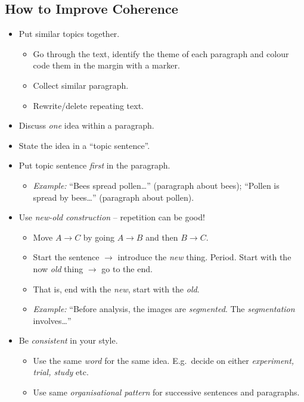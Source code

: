 \documentclass[10pt,a4paper,twocolumn]{scrartcl}
\newcommand{\ra}{\rightarrow}
\begin{document}
\subsection{How to Improve Coherence}
\begin{itemize}
    \item Put similar topics together.
        \begin{itemize}
            \item Go through the text, identify the theme of each paragraph and colour code them in the margin with a marker.
            \item Collect similar paragraph.
            \item Rewrite/delete repeating text.
        \end{itemize}
        
    \item Discuss \emph{one} idea within a paragraph.
    \item State the idea in a ``topic sentence''.
    \item Put topic sentence \emph{first} in the paragraph.
        \begin{itemize}
            \item \emph{Example:} ``Bees spread pollen\dots'' (paragraph about bees); ``Pollen is spread by bees\dots'' (paragraph about pollen).
        \end{itemize}
        
    \item Use \emph{new-old construction} -- repetition can be good!
        \begin{itemize}
            \item Move $A \ra C$ by going $A \ra B$ and then $B \ra C$.
            \item Start the sentence $\ra$ introduce the \emph{new} thing. Period. Start with the now \emph{old} thing $\ra$ go to the end.
            \item That is, end with the \emph{new}, start with the \emph{old}.
            \item \emph{Example:} ``Before analysis, the images are \emph{segmented}. The \emph{segmentation} involves\dots''
        \end{itemize}
        
    \item Be \emph{consistent} in your style.
        \begin{itemize}
            \item Use the same \emph{word} for the same idea. E.g.\ decide on either \emph{experiment, trial, study} etc.
            \item Use same \emph{organisational pattern} for successive sentences and paragraphs.
        \end{itemize}
        

\end{itemize}
\end{document}
